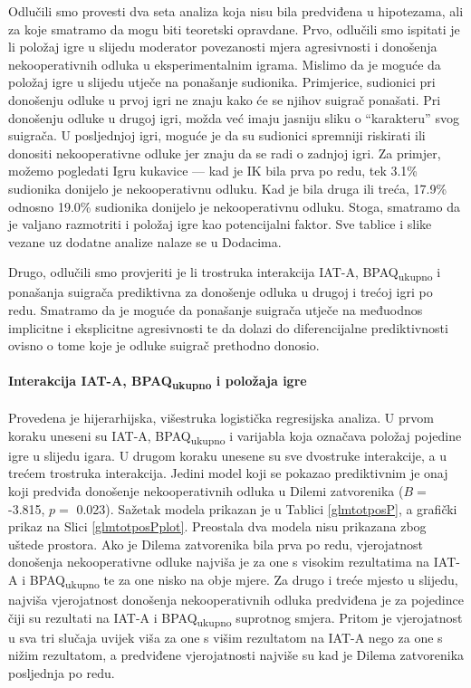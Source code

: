 \documentclass[a4paper, 12pt]{report}
\begin{document}
Odlučili smo provesti dva seta analiza koja nisu bila predviđena u hipotezama,
ali za koje smatramo da mogu biti teoretski opravdane. Prvo, odlučili smo
ispitati je li položaj igre u slijedu moderator povezanosti mjera agresivnosti i
donošenja nekooperativnih odluka u eksperimentalnim igrama. Mislimo da je moguće
da položaj igre u slijedu utječe na ponašanje sudionika. Primjerice, sudionici 
pri donošenju odluke u prvoj igri ne znaju kako će se njihov suigrač ponašati.
Pri donošenju odluke u drugoj igri, možda već imaju jasniju sliku o
\enquote{karakteru} svog suigrača. U posljednjoj igri, moguće je da su sudionici
spremniji riskirati ili donositi nekooperativne odluke jer znaju da se radi o
zadnjoj igri. Za primjer, možemo pogledati Igru kukavice --- kad je IK bila prva
po redu, tek 3.1\% sudionika donijelo je nekooperativnu odluku. Kad je bila
druga ili treća, 17.9\% odnosno 19.0\% sudionika donijelo je nekooperativnu
odluku. Stoga, smatramo da je valjano razmotriti i položaj igre kao
potencijalni faktor. Sve tablice i slike vezane uz dodatne analize nalaze se u
Dodacima. 

Drugo, odlučili smo provjeriti je li trostruka interakcija
IAT-A, BPAQ\textsubscript{ukupno} i ponašanja suigrača prediktivna za donošenje
odluka u drugoj i trećoj igri po redu. Smatramo da je moguće da ponašanje suigrača
utječe na međuodnos implicitne i eksplicitne agresivnosti te da dolazi do
diferencijalne prediktivnosti ovisno o tome koje je odluke suigrač prethodno
donosio. 

\paragraph{Interakcija IAT-A, BPAQ\textsubscript{ukupno} i položaja igre} 
Provedena je hijerarhijska, višestruka logistička regresijska analiza. U prvom
koraku uneseni su IAT-A, BPAQ\textsubscript{ukupno} i varijabla koja označava
položaj pojedine igre u slijedu igara. U drugom koraku unesene su sve dvostruke
interakcije, a u trećem trostruka interakcija.
Jedini model koji se pokazao prediktivnim je onaj koji predviđa donošenje
nekooperativnih odluka u Dilemi zatvorenika 
($B =$ -3.815, $p =$ 0.023). Sažetak modela prikazan je u Tablici
\ref{glmtotposP}, a grafički prikaz na Slici \ref{glmtotposPplot}. Preostala
dva modela nisu prikazana zbog  uštede prostora.
Ako je Dilema zatvorenika bila prva po redu, vjerojatnost donošenja nekooperativne odluke
najviša je za one s visokim rezultatima na IAT-A i BPAQ\textsubscript{ukupno}
te za one nisko na obje mjere. Za drugo i treće mjesto u slijedu,
najviša vjerojatnost donošenja nekooperativnih odluka predviđena je za pojedince
čiji su rezultati na IAT-A i BPAQ\textsubscript{ukupno} suprotnog
smjera. Pritom je vjerojatnost u sva tri slučaja uvijek viša za one s višim
rezultatom na IAT-A nego za one s nižim rezultatom, a predviđene vjerojatnosti
najviše su kad je Dilema zatvorenika posljednja po redu.
\end{document}
